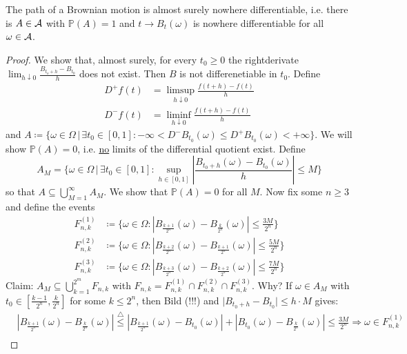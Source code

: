 \begin{lsuperwichtigersatz}
\begin{theorem}
	The path of a Brownian motion is almost surely nowhere differentiable, i.e. there is $A\in\mathcal{A}$ with $\mathbb{P}(A)=1$ and $t\to B_t(\omega)$ is nowhere differentiable for all $\omega \in \mathcal{A}$.
\end{theorem}
\end{lsuperwichtigersatz}
\begin{proof}
	We show that, almost surely, for every $t_0\geq 0$ the rightderivate $\lim_{h\downarrow 0} \frac{B_{t_o + h}-B_{t_0}}{h}$ does not exist. Then $B$ is not differenetiable in $t_0$. Define
	\begin{align*}
		D^+f(t) &= \limsup_{h\downarrow 0} \frac{f(t+h)-f(t)}{h} \\
		D^-f(t) &= \liminf_{h\downarrow 0} \frac{f(t+h)-f(t)}{h}
	\end{align*}
	and $ A \coloneqq \{ \omega \in \Omega \,|\, \exists t_0 \in [0,1]\colon -\infty < D^-B_{t_0}(\omega)\leq D^+B_{t_0}(\omega)<+\infty\}$. We will show $\mathbb{P}(A)=0$, i.e. \underline{no} limits of the differential quotient exist. Define 
	$$A_M = \bigg\{ \omega\in\Omega \,|\, \exists t_0 \in [0,1] \colon \sup_{h \in [0,1]} \left\vert \frac{B_{t_0+h}(\omega)-B_{t_0}(\omega)}{h}\right\vert \leq M\bigg\}$$
	so that $A \subseteq \bigcup_{M=1}^{\infty} A_M$. We show that $\mathbb{P}(A)=0$ for all $M$. Now fix some $n\geq 3$ and define the events
	\begin{align*}
		F_{n,k}^{(1)} &\coloneqq \bigg\{ \omega \in \Omega \colon \left\vert B_{\frac{k+1}{2^n}}(\omega)- B_{\frac{k}{2^n}}(\omega)\right\vert \leq \frac{3M}{2^n}\bigg\} \\
		F_{n,k}^{(2)} &\coloneqq \bigg\{ \omega \in \Omega \colon \left\vert B_{\frac{k+2}{2^n}}(\omega)- B_{\frac{k+1}{2^n}}(\omega)\right\vert \leq \frac{5M}{2^n}\bigg\} \\
		F_{n,k}^{(3)} &\coloneqq \bigg\{ \omega \in \Omega \colon \left\vert B_{\frac{k+3}{2^n}}(\omega)- B_{\frac{k+2}{2^n}}(\omega)\right\vert \leq \frac{7M}{2^n}\bigg\}
	\end{align*}
	Claim: $A_M \subseteq \bigcup_{k=1}^{2^m} F_{n,k}$ with $F_{n,k} = F_{n,k}^{(1)} \cap F_{n,k}^{(2)} \cap F_{n,k}^{(3)}$.
	Why? If $\omega \in A_M$ with $t_0 \in \left[ \frac{k-1}{2^n},\frac{k}{2^n}\right]$ for some $k\leq 2^n$, then Bild (!!!) and $\lvert B_{t_0+h} - B_{t_0} \rvert \leq h \cdot M$ gives:
	\begin{align*}
		&\left\vert B_{\frac{k+1}{2^n}}(\omega) - B_{\frac{k}{2^n}}(\omega)\right\vert \overset{\triangle}{\leq} \left\vert B_{\frac{k+1}{2^n}}(\omega) - B_{t_0}(\omega) \right\vert + \left\vert B_{t_0}(\omega) -  B_{\frac{k}{2^n}}(\omega) \right\vert \leq \frac{3M}{2^n} \Rightarrow \omega \in F_{n,k}^{(1)} \\

\end{align*}
\end{proof}
